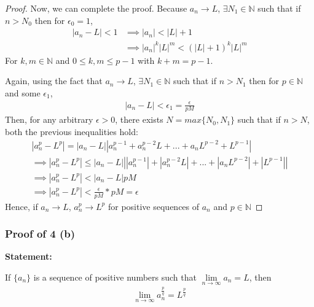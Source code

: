 \documentclass[12pt]{book}
\theoremstyle{definition}
\begin{document}
\begin{sol}
\begin{proof}
Now, we can complete the proof. Because $a_n \to L$, $\exists N_1 \in \mathbb{N}$ such that if $n > N_0$ then for $\epsilon_0 = 1$,
\begin{align*}
|a_n-L| <1 &\implies |a_n| < |L|+1 \\
&\implies |a_n|^k |L|^m <(|L|+1)^k|L|^m
\end{align*}
For $k,m \in \mathbb{N}$ and $0\leq k,m \leq p-1$ with $k+m =p-1$. 


Again, using the fact that $a_n \to L$, $\exists N_1 \in \mathbb{N}$  such that if $n > N_1$ then for $p \in \mathbb{N}$ and some $\epsilon_1$,
\begin{align*}
|a_n-L|  < \epsilon_1 = \frac{\epsilon}{pM}
\end{align*}
Then, for any arbitrary $\epsilon > 0$, there exists $N = max\{N_0, N_1\}$ such that if $n > N$, both the previous inequalities hold:
\begin{align*}
|a_n^p -L^p| = |a_n-L||a_n^{p-1}+a_n^{p-2}L+...+a_nL^{p-2}+L^{p-1}| \\
\implies |a_n^p -L^p| \leq |a_n-L|\left||a_n^{p-1}|+|a_n^{p-2}L|+...+|a_nL^{p-2}|+|L^{p-1}|\right|\\
\implies |a_n^p -L^p| < |a_n-L|pM\\ 
\implies |a_n^p -L^p| < \frac{\epsilon}{pM} * pM = \epsilon
\end{align*}
Hence, if $a_n\to L$, $a_n^p \to L^p$ for positive sequences of $a_n$ and $p \in \mathbb{N}$ 
\end{proof}
\end{sol}





\subsubsection{Proof of 4 (b)}

\textbf{Statement:}

\noindent
If $\{a_n\}$ is a sequence of positive numbers such that $\lim\limits_{n \to \infty} a_n = L$, then 
\begin{align*}
\lim\limits_{n\to \infty} a_n^{\frac{p}{q}} = L^{\frac{p}{q}}
\end{align*}
\end{document}
